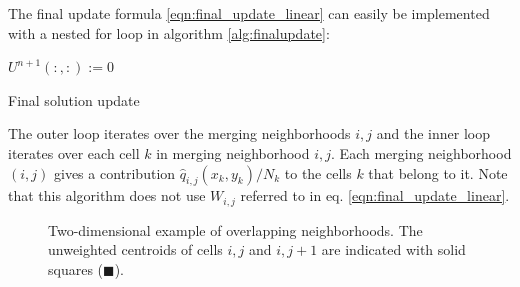 The final update formula \eqref{eqn:final_update_linear} can easily be implemented with a 
nested for loop in algorithm \ref{alg:finalupdate}:  

\begin{algorithm}[H]
\SetAlgoLined
$U^{n+1}(:,:) := 0$\\
 \caption{\sf Final solution update} \label{alg:finalupdate}
\end{algorithm}
The outer loop iterates over the merging neighborhoods $i,j$ and the inner loop 
iterates over each cell $k$ in merging neighborhood $i,j$.  Each merging 
neighborhood $(i,j)$ gives a contribution $ \hat{q}_{i,j}(x_{k}, y_k)/N_{k} $ 
to the cells $k$ that belong to it. Note that this algorithm does not use
$W_{i,j}$ referred to in eq. \eqref{eqn:final_update_linear}.

\begin{figure}
	\hfill
	\caption{\sf Two-dimensional example of overlapping neighborhoods.  The unweighted centroids of cells $i,j$ and $i,j+1$ are indicated with solid squares ($\blacksquare$).} \label{fig:2nborTile}
\end{figure}

